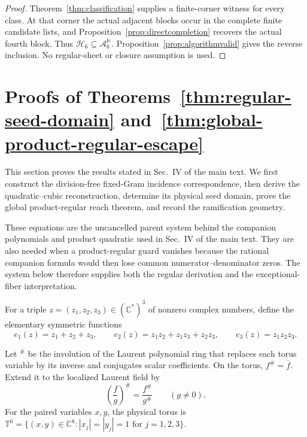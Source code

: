 \documentclass[aps,prx,reprint,nofootinbib,twoside,superscriptaddress,longbibliography,floatfix]{revtex4-2}
\theoremstyle{definition}
\newcommand{\T}{\mathbb T}
\newcommand{\C}{\mathbb C}
\newcommand{\HH}{\mathcal H}
\newcommand{\FCAtlas}{\mathcal A}
\begin{document}
\begin{proof}
{Theorem~\ref{thm:classification} supplies a finite-corner witness for every class. At that corner the actual adjacent blocks occur in the complete finite candidate lists, and Proposition~\ref{prop:directcompletion} recovers the actual fourth block. Thus $\HH_6\subseteq\FCAtlas_6^{\mathrm{fc}}$. Proposition~\ref{prop:algorithmvalid} gives the reverse inclusion. No regular-sheet or closure assumption is used.}
\end{proof}

\section{{Proofs of Theorems~\ref{thm:regular-seed-domain} and~\ref{thm:global-product-regular-escape}}}
\label{sec:supp-reconstruction-geometry}
\label{sec:supp-atlas-proofs}

{This section proves the results stated in Sec.~IV of the main text. We first construct the division-free fixed-Gram incidence correspondence, then derive the quadratic--cubic reconstruction, determine its physical seed domain, prove the global product-regular reach theorem, and record the ramification geometry.}

\def\AtlasEmbedded{1}

\label{sec:supp-global-incidence}

{These equations are the uncancelled parent system behind the companion polynomials and product quadratic used in Sec.~IV of the main text. They are also needed when a product-regular guard vanishes because the rational companion formula would then lose common numerator--denominator zeros. The system below therefore supplies both the regular derivation and the exceptional-fiber interpretation.}

For a triple $z=(z_1,z_2,z_3)\in(\C^*)^3$ of nonzero complex numbers, define the elementary symmetric functions
\begin{equation}
e_1(z)=z_1+z_2+z_3,\qquad
e_2(z)=z_1z_2+z_1z_3+z_2z_3,\qquad
e_3(z)=z_1z_2z_3.
\label{eq:supp-elementary}
\end{equation}

Let $^{\#}$ be the involution of the Laurent polynomial ring that replaces each torus variable by its inverse and conjugates scalar coefficients.  On the torus, $f^\#=\overline f$. Extend it to the localized Laurent field by
\begin{equation}
\left(\frac fg\right)^\#=\frac{f^\#}{g^\#}
\qquad(g\ne0).
\label{eq:supp-sharp-localization}
\end{equation}
For the paired variables $x,y$, the physical torus is $\T^6=\{(x,y)\in\C^6:|x_j|=|y_j|=1\text{ for }j=1,2,3\}$.
\end{document}

